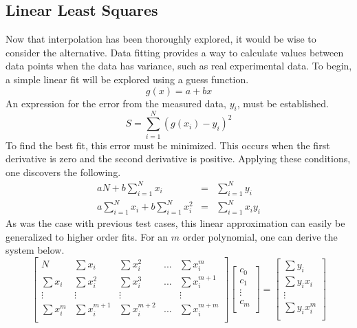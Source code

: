 \documentclass[12pt]{article}
\begin{document}
\subsection{Linear Least Squares}
Now that interpolation has been thoroughly explored, it would be wise to consider the alternative.  Data fitting provides a way to calculate values between data points when the data has variance, such as real experimental data.  To begin, a simple linear fit will be explored using a guess function.
\begin{equation}
\label{Line}
g(x)=a+bx
\end{equation}
An expression for the error from the measured data, $y_i$, must be established.
\begin{equation}
\label{LineError}
S=\sum_{i=1}^N (g(x_i)-y_i)^2
\end{equation}
To find the best fit, this error must be minimized.  This occurs when the first derivative is zero and the second derivative is positive.  Applying these conditions, one discovers the following.
\begin{eqnarray}
\label{LineSolution}
aN+b\sum_{i=1}^N x_i &=& \sum_{i=1}^N y_i \\
a\sum_{i=1}^N x_i + b\sum_{i=1}^N x^2_i &=& \sum_{i=1}^N x_i y_i
\end{eqnarray}
As was the case with previous test cases, this linear approximation can easily be generalized to higher order fits.  For an $m$ order polynomial, one can derive the system below.
\[
\begin{bmatrix}
N & \sum x_i &\sum x^2_i &... &\sum x^m_i \\
\sum x_i &\sum x^2_i & \sum x^3_i &...& \sum x^{m+1}_i \\
 \vdots& \vdots & \vdots & &\vdots \\
\sum x^m_i &\sum x^{m+1}_i &\sum x^{m+2}_i & ... & \sum x^{m+m}_i \\
\end{bmatrix}
\begin{bmatrix}
c_0\\
c_1\\
\vdots\\
c_m \\ 
\end{bmatrix}
=
\begin{bmatrix}
\sum y_i\\
\sum y_ix_i\\
\vdots \\
\sum y_ix^m_i \\
\end{bmatrix}
 \]
\end{document}
